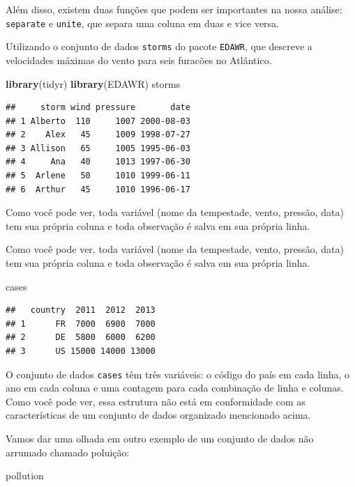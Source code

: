 \documentclass[a4paper]{book}
\newenvironment{Shaded}{\begin{snugshade}}{\end{snugshade}}
\newcommand{\KeywordTok}[1]{\textcolor[rgb]{0.13,0.29,0.53}{\textbf{#1}}}
\newcommand{\NormalTok}[1]{#1}
\begin{document}
Além disso, existem duas funções que podem ser importantes na nossa análise: \texttt{separate} e \texttt{unite}, que separa uma coluna em duas e vice versa.

Utilizando o conjunto de dados \texttt{storms} do pacote \texttt{EDAWR}, que descreve a velocidades máximas do vento para seis furacões no Atlântico.

\begin{Shaded}
\begin{Highlighting}[]
\KeywordTok{library}\NormalTok{(tidyr)}
\KeywordTok{library}\NormalTok{(EDAWR)}
\NormalTok{storms}
\end{Highlighting}
\end{Shaded}

\begin{verbatim}
##     storm wind pressure       date
## 1 Alberto  110     1007 2000-08-03
## 2    Alex   45     1009 1998-07-27
## 3 Allison   65     1005 1995-06-03
## 4     Ana   40     1013 1997-06-30
## 5  Arlene   50     1010 1999-06-11
## 6  Arthur   45     1010 1996-06-17
\end{verbatim}

Como você pode ver, toda variável (nome da tempestade, vento, pressão, data) tem sua própria coluna e toda observação é salva em sua própria linha.

Como você pode ver, toda variável (nome da tempestade, vento, pressão, data) tem sua própria coluna e toda observação é salva em sua própria linha.

\begin{Shaded}
\begin{Highlighting}[]
\NormalTok{cases}
\end{Highlighting}
\end{Shaded}

\begin{verbatim}
##   country  2011  2012  2013
## 1      FR  7000  6900  7000
## 2      DE  5800  6000  6200
## 3      US 15000 14000 13000
\end{verbatim}

O conjunto de dados \texttt{cases} têm três variáveis: o código do país em cada linha, o ano em cada coluna e uma contagem para cada combinação de linha e colunas. Como você pode ver, essa estrutura não está em conformidade com as características de um conjunto de dados organizado mencionado acima.

Vamos dar uma olhada em outro exemplo de um conjunto de dados não arrumado chamado poluição:

\begin{Shaded}
\begin{Highlighting}[]
\NormalTok{pollution}
\end{Highlighting}
\end{Shaded}
\end{document}
